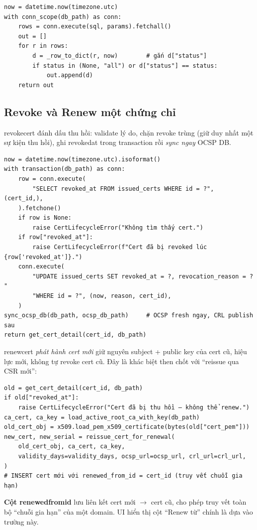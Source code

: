 \documentclass[12pt,a4paper]{article}
\newcommand{\code}[1]{{\ttfamily\small\def\_{\textunderscore\discretionary{}{}{}}#1}}
\begin{document}
\begin{Verbatim}
now = datetime.now(timezone.utc)
with conn_scope(db_path) as conn:
    rows = conn.execute(sql, params).fetchall()
    out = []
    for r in rows:
        d = _row_to_dict(r, now)        # gắn d["status"]
        if status in (None, "all") or d["status"] == status:
            out.append(d)
    return out
\end{Verbatim}

\subsection{Revoke và Renew một chứng chỉ}

\code{revoke\_cert} đánh dấu thu hồi: validate lý do, chặn revoke trùng (giữ duy
nhất một sự kiện thu hồi), ghi \code{revoked\_at} trong transaction rồi
\emph{sync ngay} OCSP DB.

\begin{Verbatim}
now = datetime.now(timezone.utc).isoformat()
with transaction(db_path) as conn:
    row = conn.execute(
        "SELECT revoked_at FROM issued_certs WHERE id = ?", (cert_id,),
    ).fetchone()
    if row is None:
        raise CertLifecycleError("Không tìm thấy cert.")
    if row["revoked_at"]:
        raise CertLifecycleError(f"Cert đã bị revoked lúc {row['revoked_at']}.")
    conn.execute(
        "UPDATE issued_certs SET revoked_at = ?, revocation_reason = ? "
        "WHERE id = ?", (now, reason, cert_id),
    )
sync_ocsp_db(db_path, ocsp_db_path)     # OCSP fresh ngay, CRL publish sau
return get_cert_detail(cert_id, db_path)
\end{Verbatim}

\code{renew\_cert} \emph{phát hành cert mới} giữ nguyên subject + public key của
cert cũ, hiệu lực mới, không tự revoke cert cũ. Đây là khác biệt then chốt với
``reissue qua CSR mới'':

\begin{Verbatim}
old = get_cert_detail(cert_id, db_path)
if old["revoked_at"]:
    raise CertLifecycleError("Cert đã bị thu hồi — không thể renew.")
ca_cert, ca_key = load_active_root_ca_with_key(db_path)
old_cert_obj = x509.load_pem_x509_certificate(bytes(old["cert_pem"]))
new_cert, new_serial = reissue_cert_for_renewal(
    old_cert_obj, ca_cert, ca_key,
    validity_days=validity_days, ocsp_url=ocsp_url, crl_url=crl_url,
)
# INSERT cert mới với renewed_from_id = cert_id (truy vết chuỗi gia hạn)
\end{Verbatim}

\begin{notebox}
\textbf{Cột \code{renewed\_from\_id}} lưu liên kết cert mới $\to$ cert cũ, cho
phép truy vết toàn bộ ``chuỗi gia hạn'' của một domain. UI hiển thị cột ``Renew
từ'' chính là dựa vào trường này.
\end{notebox}
\end{document}
